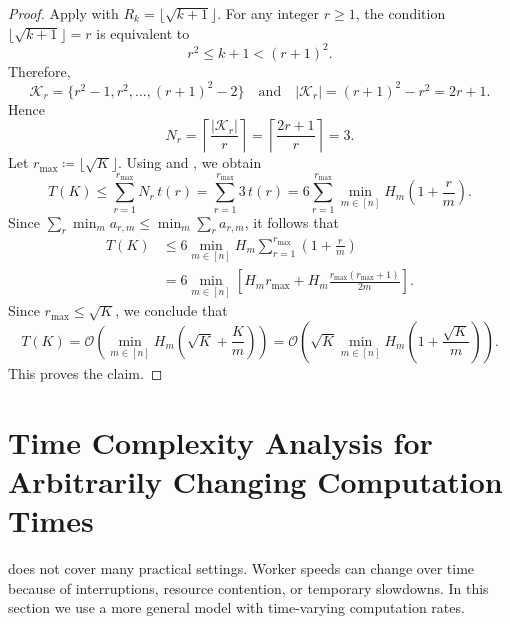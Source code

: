 \documentclass{article}
\begin{document}
\begin{proof}
    Apply  with $R_k = \lfloor \sqrt{k+1} \rfloor$.
    For any integer $r \ge 1$, the condition $\lfloor \sqrt{k+1} \rfloor = r$ is equivalent to
    \begin{equation*}
        r^2 \le k+1 < (r+1)^2.
    \end{equation*}
    Therefore,
    \begin{equation*}
        \mathcal{K}_r = \{r^2-1, r^2, \dots, (r+1)^2-2\}
        \quad \text{and} \quad
        |\mathcal{K}_r| = (r+1)^2-r^2 = 2r+1.
    \end{equation*}
    Hence
    \begin{equation*}
        N_r = \left\lceil \frac{|\mathcal{K}_r|}{r} \right\rceil
        = \left\lceil \frac{2r+1}{r} \right\rceil
        = 3.
    \end{equation*}
    Let $r_{\max} \coloneqq \lfloor \sqrt{K} \rfloor$.
    Using  and , we obtain
    \begin{equation*}
        T(K) \le \sum_{r=1}^{r_{\max}} N_r\, t(r)
        = \sum_{r=1}^{r_{\max}} 3\, t(r)
        = 6 \sum_{r=1}^{r_{\max}} \min_{m \in [n]} H_m \left( 1 + \frac{r}{m} \right) .
    \end{equation*}
    Since $\sum_r \min_m a_{r,m} \le \min_m \sum_r a_{r,m}$, it follows that
    \begin{align*}
        T(K)
        &\le 6 \min_{m \in [n]} 
            H_m \sum_{r=1}^{r_{\max}} \left( 1 + \frac{r}{m} \right)
        \\
        &= 6 \min_{m \in [n]} \left[
            H_m r_{\max}
            + H_m \frac{r_{\max}(r_{\max}+1)}{2m}
        \right].
    \end{align*}
    Since $r_{\max} \le \sqrt{K}$, we conclude that
    \begin{equation*}
        T(K)
        = \mathcal{O}\left( \min_{m \in [n]} H_m \left( \sqrt{K} + \frac{K}{m} \right) \right)
        = \mathcal{O}\left( \sqrt{K} \min_{m \in [n]} H_m \left( 1 + \frac{\sqrt{K}}{m} \right) \right).
    \end{equation*}
    This proves the claim.
\end{proof}
% 
% 
% 
\newpage
\section{Time Complexity Analysis for Arbitrarily Changing Computation Times}\label{sec:arbitrary_time}
% 
 does not cover many practical settings.
Worker speeds can change over time because of interruptions, resource contention, or temporary slowdowns.
In this section we use a more general model with time-varying computation rates.
\end{document}
